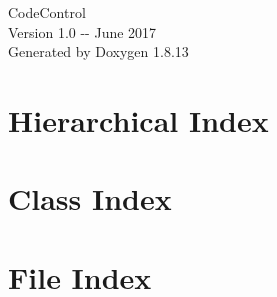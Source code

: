 \documentclass[twoside]{book}
\newcommand{\+}{\discretionary{\mbox{\scriptsize$\hookleftarrow$}}{}{}}
\newcommand{\clearemptydoublepage}{%
  \newpage{\pagestyle{empty}\cleardoublepage}%
}
\begin{document}
\hypersetup{pageanchor=false,
             bookmarksnumbered=true,
             pdfencoding=unicode
            }
\begin{titlepage}
\vspace*{7cm}
\begin{center}%
{\Large Code\+Control \\[1ex]\large Version 1.\+0 -\/-\/ June 2017 }\\
\vspace*{1cm}
{\large Generated by Doxygen 1.8.13}\\
\end{center}
\end{titlepage}
\clearemptydoublepage
{}
\tableofcontents
\clearemptydoublepage
{}
\hypersetup{pageanchor=true}

\chapter{Hierarchical Index}

\chapter{Class Index}

\chapter{File Index}

\end{document}
